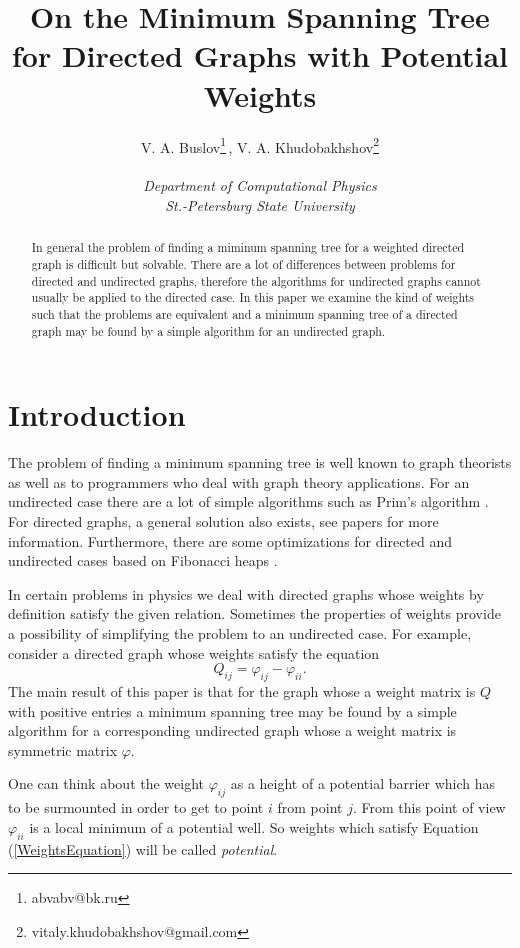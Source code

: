 \documentclass[10pt]{article}
\title{On the Minimum Spanning Tree for Directed Graphs with Potential Weights}
\author{V. A. Buslov\thanks{abvabv@bk.ru}\,,
 V. A. Khudobakhshov\thanks{vitaly.khudobakhshov@gmail.com}
 \\ \\ \textit{Department of
Computational Physics} \\ \textit{St.-Petersburg State
University}}
\begin{document}
\maketitle


\begin{abstract}
In general the problem of finding a miminum spanning tree for a weighted
directed graph is difficult but solvable. There are a lot of differences
between problems for directed and undirected graphs, therefore the algorithms
for undirected graphs cannot usually be applied to the directed case. In this
paper we examine the kind of weights such that the problems are equivalent
and a minimum spanning tree of a directed graph may be found by a simple
algorithm for an undirected graph.
\end{abstract}

\section{Introduction}
The problem of finding a minimum spanning tree is well known to graph theorists
as well as to programmers who deal with graph theory applications. For
an undirected case there are a lot of simple algorithms such as Prim's algorithm
\cite{Prim:57}. For directed graphs, a general solution also exists, see papers
\cite{Bock:71, Chu-Liu:65, Edmonds:67} for more information. Furthermore, there
are some optimizations for directed and undirected cases based on Fibonacci
heaps \cite{Gab-Gal-Spe:86}.

In certain problems in physics we deal with directed graphs whose weights
by definition satisfy the given relation. Sometimes the properties of weights
provide a possibility of simplifying the problem to an undirected case. For
example, consider a directed graph whose weights satisfy the equation 
\begin{equation}\label{WeightsEquation}
	Q_{ij} = \varphi_{ij} - \varphi_{ii}.
\end{equation}
The main result of this paper is that for the graph whose a weight matrix is $Q$
with positive entries a minimum spanning tree may be found by a simple algorithm
for a corresponding undirected graph whose a weight matrix is symmetric
matrix $\varphi$.

One can think about the weight $\varphi_{ij}$ as a height of a potential barrier
which has to be surmounted in order to get to point $i$ from point $j$. From
this point of view $\varphi_{ii}$ is a local minimum of a potential well.
So weights which satisfy Equation (\ref{WeightsEquation}) will be called
\emph{potential}.
\end{document}
